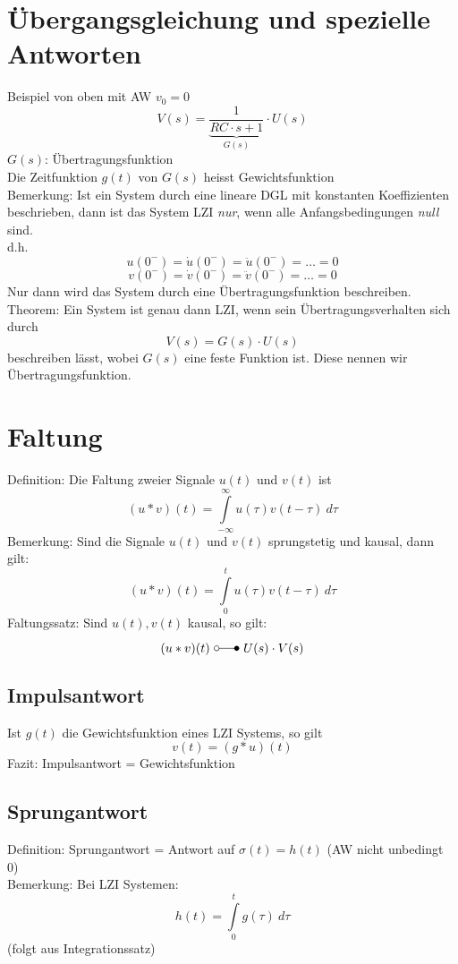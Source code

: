 \section{Übergangsgleichung und spezielle Antworten}
Beispiel von oben mit AW $v_0 = 0$
\[ V(s) = \underbrace{\frac{1}{RC \cdot s + 1}}_{G(s)} \cdot U(s) \]
$G(s)$: Übertragungsfunktion\\
Die Zeitfunktion $g(t)$ von $G(s)$ heisst Gewichtsfunktion\\
Bemerkung: Ist ein System durch eine lineare DGL mit konstanten Koeffizienten 
beschrieben, dann ist das System LZI \emph{nur}, wenn alle Anfangsbedingungen
\emph{null} sind. \\
d.h. 
\[ u(0^-) = \dot{u}(0^-) = \ddot{u}(0^-) = \ldots = 0 \]
\[ v(0^-) = \dot{v}(0^-) = \ddot{v}(0^-) = \ldots = 0 \]
Nur dann wird das System durch eine Übertragungsfunktion beschreiben. \\
Theorem: 
Ein System ist genau dann LZI, wenn sein Übertragungsverhalten sich durch 
\[ V(s) = G(s) \cdot U(s) \]
beschreiben lässt, wobei $G(s)$ eine feste Funktion ist. Diese nennen wir 
Übertragungsfunktion. 

\section{Faltung}
Definition: Die Faltung zweier Signale $u(t)$ und $v(t)$ ist 
\[ (u * v)(t) = \int\limits_{-\infty}^{\infty} u(\tau) v(t - \tau) ~ d \tau \]
Bemerkung: Sind die Signale $u(t)$ und $v(t)$ sprungstetig und kausal, dann 
gilt: 
\[ (u * v)(t) = \int\limits_{0}^{t} u(\tau) v(t - \tau) ~ d \tau \]
Faltungssatz: 
Sind $u(t), v(t)$ kausal, so gilt: 
\[ (u * v) (t) ~ \laplace ~ U(s) \cdot V(s) \]

\subsection{Impulsantwort}
Ist $g(t)$ die Gewichtsfunktion eines LZI Systems, so gilt
\[ v(t) = (g * u)(t) \]
Fazit: Impulsantwort = Gewichtsfunktion

\subsection{Sprungantwort}
Definition: Sprungantwort = Antwort auf $\sigma(t) = h(t)$ 
(AW nicht unbedingt 0) \\
Bemerkung: Bei LZI Systemen: 
\[ h(t) = \int\limits_{0}^{t} g(\tau) ~d \tau \]
(folgt aus Integrationssatz)
